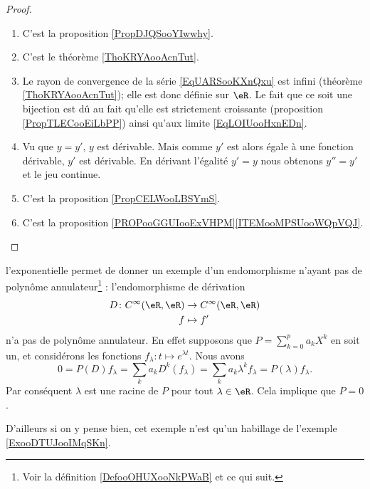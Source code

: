 \begin{proof}
    \begin{enumerate}
        \item
            C'est la proposition \ref{PropDJQSooYIwwhy}.
        \item 
            C'est le théorème \ref{ThoKRYAooAcnTut}.
        \item
            Le rayon de convergence de la série \eqref{EqUARSooKXnQxu} est infini (théorème \ref{ThoKRYAooAcnTut}); elle est donc définie sur \( \eR\). Le fait que ce soit une bijection est dû au fait qu'elle est strictement croissante (proposition \ref{PropTLECooEiLbPP}) ainsi qu'aux limite \eqref{EqLOIUooHxnEDn}.
        \item
            Vu que \( y=y'\), \( y\) est dérivable. Mais comme \( y'\) est alors égale à une fonction dérivable, \( y'\) est dérivable. En dérivant l'égalité \( y'=y\) nous obtenons \( y''=y'\) et le jeu continue.
        \item
            C'est la proposition \ref{PropCELWooLBSYmS}.
        \item
            C'est la proposition \ref{PROPooGGUIooExVHPM}\ref{ITEMooMPSUooWQpVQJ}.
    \end{enumerate}
\end{proof}

\begin{example}     \label{ExooLRHCooMYLQTU}
    l'exponentielle permet de donner un exemple d'un endomorphisme n'ayant pas de polynôme annulateur\footnote{Voir la définition \ref{DefooOHUXooNkPWaB} et ce qui suit.} : l'endomorphisme de dérivation
    \begin{equation}
        \begin{aligned}
            D\colon C^{\infty}(\eR,\eR)&\to  C^{\infty}(\eR,\eR) \\
            f&\mapsto f' 
        \end{aligned}
    \end{equation}
    n'a pas de polynôme annulateur. En effet supposons que \( P=\sum_{k=0}^{p}a_kX^k\) en soit un, et considérons les fonctions \( f_{\lambda}\colon t\mapsto  e^{\lambda t}\). Nous avons
    \begin{equation}
            0=P(D)f_{\lambda}
            =\sum_ka_kD^k(f_{\lambda})
            =\sum_ka_k\lambda^kf_{\lambda}
            =P(\lambda)f_{\lambda}.
    \end{equation}
    Par conséquent \( \lambda\) est une racine de \( P\) pour tout \( \lambda\in \eR\). Cela implique que \( P=0\).
    
    D'ailleurs si on y pense bien, cet exemple n'est qu'un habillage de l'exemple \ref{ExooDTUJooIMqSKn}.
\end{example}

